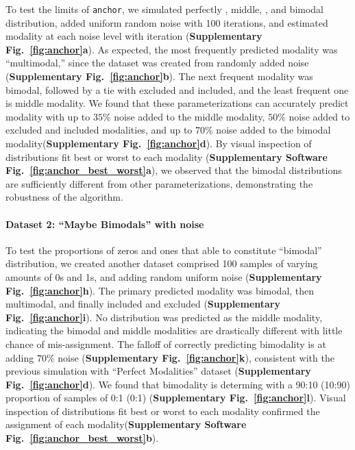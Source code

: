 To test the limits of \texttt{anchor}, we simulated perfectly \0, middle, \1, and bimodal distribution, added uniform random noise with 100 iterations, and estimated modality at each noise level with iteration (\textbf{Supplementary Fig.~\ref{fig:anchor}a}). As expected, the most frequently predicted modality was ``multimodal,'' since the dataset was created from randomly added noise (\textbf{Supplementary Fig.~\ref{fig:anchor}b}). The next frequent modality was bimodal, followed by a tie with excluded and included, and the least frequent one is middle modality. We found that these parameterizations can accurately predict modality with up to $35\%$ noise added to the middle modality, $50\%$ noise added to excluded and included modalities, and up to $70\%$ noise added to the bimodal modality(\textbf{Supplementary Fig.~\ref{fig:anchor}d}). By visual inspection of distributions fit best or worst to each modality (\textbf{Supplementary Software Fig.~\ref{fig:anchor_best_worst}a}), we observed that the bimodal distributions are sufficiently different from other parameterizations, demonstrating the robustness of the algorithm.


\paragraph{Dataset 2: ``Maybe Bimodals'' with noise}
\label{sec:anchor_maybe_bimodals}

To test the proportions of zeros and ones that able to constitute ``bimodal'' distribution, we created another dataset comprised 100 samples of varying amounts of 0s and 1s, and adding random uniform noise (\textbf{Supplementary Fig.~\ref{fig:anchor}h}). The primary predicted modality was bimodal, then multimodal, and finally included and excluded (\textbf{Supplementary Fig.~\ref{fig:anchor}i}). No distribution was predicted as the middle modality, indicating the bimodal and middle modalities are drastically different with little chance of mis-assignment. The falloff of correctly predicting bimodality is at adding $70\%$ noise (\textbf{Supplementary Fig.~\ref{fig:anchor}k}), consistent with the previous simulation with ``Perfect Modalities'' dataset (\textbf{Supplementary Fig.~\ref{fig:anchor}d}). We found that bimodality is determing with a 90:10 (10:90) proportion of samples of 0:1 (0:1) (\textbf{Supplementary Fig.~\ref{fig:anchor}l}). Visual inspection of distributions fit best or worst to each modality confirmed the assignment of each modality(\textbf{Supplementary Software Fig.~\ref{fig:anchor_best_worst}b}).


